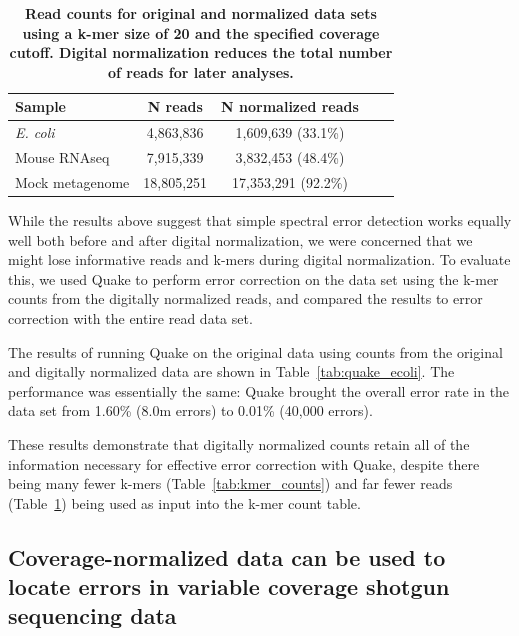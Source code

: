 \documentclass{article}
\begin{document}

\begin{table}
\centering
\begin{tabular}{|l|c|c|c|c|}
\hline
Sample              & N reads    & N normalized reads \\
\hline
{\em E. coli}       & 4,863,836   & 1,609,639 (33.1\%) \\
Mouse RNAseq        & 7,915,339   & 3,832,453 (48.4\%) \\
Mock metagenome     & 18,805,251  & 17,353,291 (92.2\%) \\

\hline
\end{tabular}

\caption{{\bf Read counts for original and normalized data sets using
    a k-mer size of 20 and the specified coverage cutoff. Digital
    normalization reduces the total number of reads for later analyses.}}
\label{tab:read_counts}
\end{table}

While the results above suggest that simple spectral error detection
works equally well both before and after digital normalization, we
were concerned that we might lose informative reads and k-mers during
digital normalization.  To evaluate this, we used Quake to perform
error correction on the data set using the k-mer counts from the
digitally normalized reads, and compared the results to error
correction with the entire read data set.

The results of running Quake on the original data using counts from
the original and digitally normalized data are shown in
Table~\ref{tab:quake_ecoli}.  The performance was essentially the
same: Quake brought the overall error rate in the data set from 1.60\%
(8.0m errors) to 0.01\% (40,000 errors).

These results demonstrate that digitally normalized counts retain all
of the information necessary for effective error correction with
Quake, despite there being many fewer k-mers
(Table~\ref{tab:kmer_counts}) and far fewer reads
(Table~\ref{tab:read_counts}) being used as input into the k-mer count
table.

\subsection{Coverage-normalized data can be used to locate errors in variable
coverage shotgun sequencing data}
\end{document}
